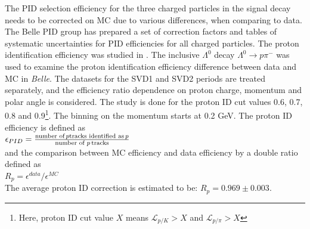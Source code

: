 The PID selection efficiency for the three charged particles in the signal decay needs
to be corrected on MC due to various differences, when comparing to data. The
Belle PID group has prepared a set of correction factors and tables of systematic
uncertainties for PID efficiencies for all charged particles.
The proton identification efficiency was studied in \cite{PIDeff}.
The inclusive $\Lambda^0$ decay $\Lambda^0 \rightarrow p \pi^-$   was used to examine the proton identification efficiency difference between data and MC in \textit{Belle}. The datasets for the SVD1 and SVD2 periods are treated separately, and the efficiency ratio dependence on proton charge, momentum and polar angle is considered. The study is done for the proton ID cut values 0.6, 0.7, 0.8 and 0.9\footnote{Here, proton ID cut value $X$ means $  \mathcal{L}_{p/K} > X$ and $  \mathcal{L}_{p/\pi} > X$}. The binning on the momentum starts at 0.2 GeV. 
The proton ID efficiency is defined as\\
\vspace{0.2cm}
\newline
\hspace{3 cm}    $\epsilon_{PID} = \frac{\text{number of}\hspace{0.05 cm}p \text{tracks identified as} \hspace{0.05 cm} p}{\text{number of }p \hspace{0.05 cm} \text{tracks} }$\\

\vspace{0.2cm}
 and the comparison between MC efficiency and data efficiency by a double ratio defined as \\

\vspace{0.2cm} \hspace{1 cm}  $ R_p = \epsilon^{data}/\epsilon^{MC}$ \\

\vspace{0.5cm}
\noindent The average proton ID correction is estimated to be: \hspace{0.5 cm} $R_p = 0.969 \pm 0.003$.

